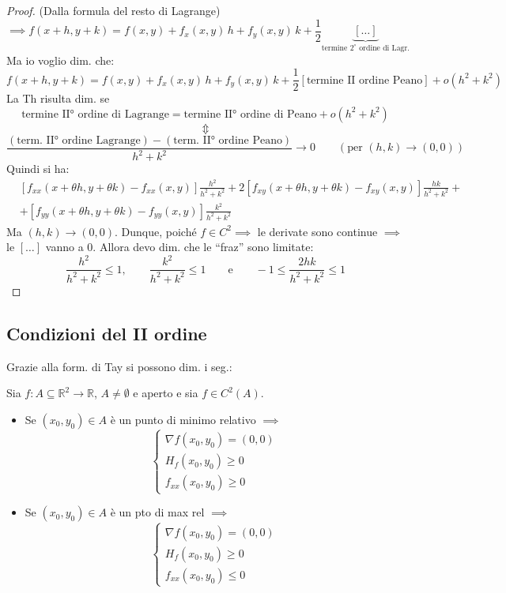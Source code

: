 \begin{proof}
(Dalla formula del resto di Lagrange)
\[
\implies f(x + h, y + k) = f(x, y) + f_x(x, y)\, h + f_y(x, y)\, k + \frac{1}{2} \underbrace{[\dots]}_{\text{termine } 2^\circ \text{ ordine di Lagr.}}
\]
Ma io voglio dim. che:
\[
f(x + h, y + k) = f(x, y) + f_x(x, y)\, h + f_y(x, y)\, k + \frac{1}{2} \left[ \text{termine II ordine Peano} \right] + o(h^2 + k^2)
\]
La Th risulta dim. se
\[
\text{termine II° ordine di Lagrange} = \text{termine II° ordine di Peano} + o(h^2 + k^2)
\]
\[
\Updownarrow
\]
\[
\frac{(\text{term. II° ordine Lagrange}) - (\text{term. II° ordine Peano})}{h^2 + k^2} \to 0 \qquad (\text{per } (h, k) \to (0, 0))
\]
Quindi si ha:
\begin{align*}
&\left[ f_{xx}(x + \theta h, y + \theta k) - f_{xx}(x, y) \right] \frac{h^2}{h^2 + k^2} + 2 \left[ f_{xy}(x + \theta h, y + \theta k) - f_{xy}(x, y) \right] \frac{hk}{h^2 + k^2} + \\
&+ \left[ f_{yy}(x + \theta h, y + \theta k) - f_{yy}(x, y) \right] \frac{k^2}{h^2 + k^2}
\end{align*}
Ma $(h, k) \to (0, 0)$. Dunque, poiché $f \in C^2 \implies$ le derivate sono continue $\implies$ le $[\dots]$ vanno a $0$. Allora devo dim. che le ``fraz'' sono limitate:
\[
\frac{h^2}{h^2 + k^2} \le 1, \qquad \frac{k^2}{h^2 + k^2} \le 1 \qquad \text{e} \qquad -1 \le \frac{2hk}{h^2 + k^2} \le 1
\]
\end{proof}

\subsection{Condizioni del II ordine}

Grazie alla form. di Tay si possono dim. i seg.:

\begin{theorem}

Sia $f : A \subseteq \mathbb{R}^2 \to \mathbb{R}$, $A \neq \emptyset$ e aperto e sia $f \in C^2(A)$.
\begin{itemize}
    \item Se $(x_0, y_0) \in A$ è un punto di minimo relativo $\implies$
    \[
    \begin{cases}
    \nabla f(x_0, y_0) = (0, 0) \\
    H_f(x_0, y_0) \ge 0 \\
    f_{xx}(x_0, y_0) \ge 0
    \end{cases}
    \]
    \item Se $(x_0, y_0) \in A$ è un pto di max rel $\implies$
    \[
    \begin{cases}
    \nabla f(x_0, y_0) = (0, 0) \\
    H_f(x_0, y_0) \ge 0 \\
    f_{xx}(x_0, y_0) \le 0
    \end{cases}
    \]
\end{itemize}
\end{theorem}

